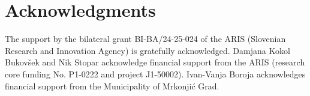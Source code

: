 \documentclass[12pt,a4paper]{amsart}
\theoremstyle{definition}
\begin{document}
\section*{Acknowledgments}
The support by the bilateral grant BI-BA/24-25-024 of the ARIS (Slovenian Research and Innovation Agency) is gratefully acknowledged. Damjana Kokol Bukovšek and Nik Stopar acknowledge financial support from the ARIS (research core funding No. P1-0222 and project J1-50002). Ivan-Vanja Boroja acknowledges financial support from the Municipality of Mrkonjić Grad.




\end{document}
